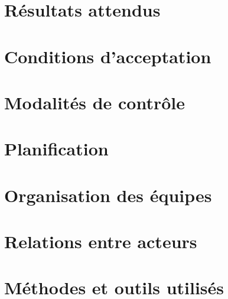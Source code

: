 \section{Résultats attendus}

\section{Conditions d’acceptation}

\section{Modalités de contrôle}

\section{Planification}

\section{Organisation des équipes}

\section{Relations entre acteurs}

\section{Méthodes et outils utilisés}
